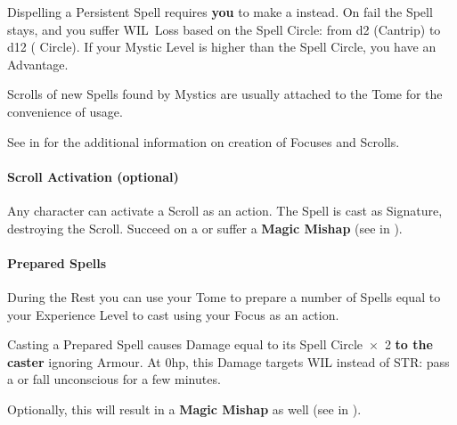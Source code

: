 \documentclass[itdr]{subfiles}
\begin{document}
Dispelling a Persistent Spell requires \textbf{you} to make a  instead. On fail the Spell stays, and you suffer WIL~Loss based on the Spell Circle: from d2 (Cantrip) to d12 ( Circle). If your Mystic Level is higher than the Spell Circle, you have an Advantage.

\vfill
\begin{dbox}
	Scrolls of new Spells found by Mystics are usually attached to the Tome for the convenience of usage.

	See \textbf{} in \mbox{\textbf{}} for the additional information on creation of Focuses and Scrolls.
\end{dbox}

\vfill
{}
\begin{dbox}
	\paragraph{Scroll Activation (optional)}
	Any character can activate a Scroll as an action. The Spell is cast as Signature, destroying the Scroll. Succeed on a  or suffer a \textbf{Magic Mishap} (see \textbf{} in \textbf{}).
\end{dbox}

\break

\paragraph{Prepared Spells}
During the Rest you can use your Tome to prepare a number of Spells equal to your Experience Level to cast using your Focus as an action.

Casting a Prepared Spell causes Damage equal to its Spell Circle~$\times$~2 \textbf{to the caster} ignoring Armour. At 0hp, this Damage targets WIL instead of STR: pass a  or fall unconscious for a few minutes.
\begin{dbox}
	Optionally, this will result in a \textbf{Magic Mishap} as well (see \textbf{} in \textbf{}).
\end{dbox}

\vfill
{}
\end{document}
